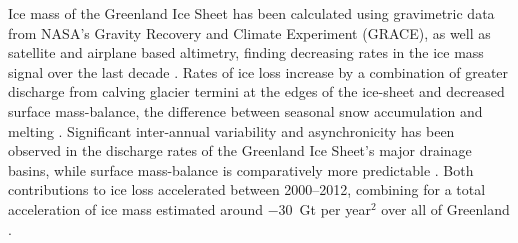 \documentclass[11pt]{report}
\begin{document}
Ice mass of the Greenland Ice Sheet has been calculated using
gravimetric data from NASA's Gravity
Recovery and Climate Experiment (GRACE), as well as satellite and airplane based
altimetry, finding decreasing rates in the ice mass signal over the last
decade \cite[][]{khan2015,Harig+2016}. Rates of ice loss increase by a
combination of greater discharge from calving glacier termini at the edges of
the ice-sheet and decreased surface mass-balance, the difference between
seasonal snow accumulation and melting \cite[][]{khan2015,enderlin2014}.
Significant inter-annual variability and asynchronicity has been observed in
the discharge rates of the Greenland Ice Sheet's major drainage basins, while
surface mass-balance is comparatively more predictable
\cite[][]{mcmillan2016,enderlin2014}. Both contributions to ice loss accelerated between 2000--2012, combining for a total acceleration of ice mass
estimated around $-30$~Gt per year$^2$ over all of Greenland
\cite[][]{velicogna2009,enderlin2014}.
\end{document}

